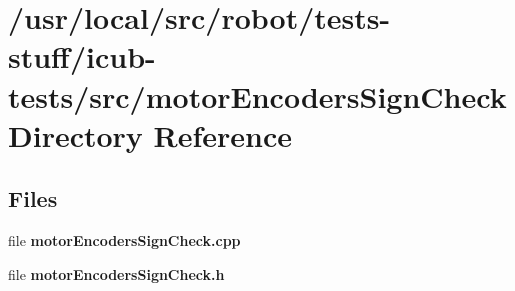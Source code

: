 \section{/usr/local/src/robot/tests-\/stuff/icub-\/tests/src/motor\-Encoders\-Sign\-Check Directory Reference}
\label{dir_381e91bea29aa132c7ddaeecf0705ee9}
\subsection*{Files}
\begin{DoxyCompactItemize}
\item 
file {\bfseries motor\-Encoders\-Sign\-Check.\-cpp}
\item 
file {\bfseries motor\-Encoders\-Sign\-Check.\-h}
\end{DoxyCompactItemize}
